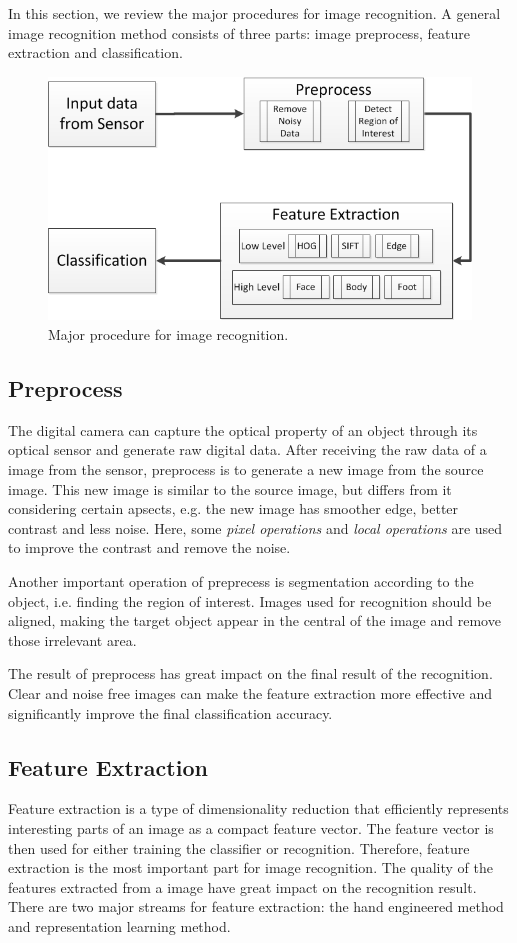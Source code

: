 In this section, we review the major procedures for image recognition. 
A general image recognition method consists of three parts: image preprocess, feature extraction and classification.

\begin{figure}
	\centering
	\includegraphics[scale=.8]{introduction/fig/IRflow.png}
	\caption{Major procedure for image recognition.}\label{fig:intro:irflow}
\end{figure}
\subsection{Preprocess}
The digital camera can capture the optical property of an object through its optical sensor and generate raw digital data.
After receiving the raw data of a image from the sensor, preprocess is to generate a new image from the source image. This new image is similar to the source image, but differs from it considering certain apsects, e.g. the new image has smoother edge, better contrast and less noise. 
Here, some \textit{pixel operations} and \textit{local operations} are used to improve the contrast and remove the noise.  

Another important operation of preprecess is segmentation according to the object, i.e. finding the region of interest. Images used for recognition should be aligned, making the target object appear in the central of the image and remove those irrelevant area.

The result of preprocess has great impact on the final result of the recognition. Clear and noise free images can make the feature extraction more effective and significantly improve the final classification accuracy.

\subsection{Feature Extraction}
 Feature extraction is a type of dimensionality reduction that efficiently represents interesting parts of an image as a compact feature vector. The feature vector is then used for either training the classifier or recognition. Therefore, feature extraction is the most important part for image recognition. The quality of the features extracted from a image have great impact on the recognition result. There are two major streams for feature extraction: the hand engineered method and representation learning method.

